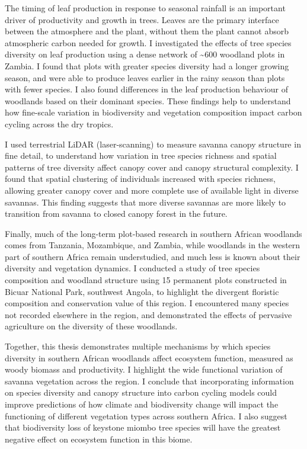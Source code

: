 The timing of leaf production in response to seasonal rainfall is an important driver of productivity and growth in trees. Leaves are the primary interface between the atmosphere and the plant, without them the plant cannot absorb atmospheric carbon needed for growth. I investigated the effects of tree species diversity on leaf production using a dense network of \textasciitilde{}600 woodland plots in Zambia. I found that plots with greater species diversity had a longer growing season, and were able to produce leaves earlier in the rainy season than plots with fewer species. I also found differences in the leaf production behaviour of woodlands based on their dominant species. These findings help to understand how fine-scale variation in biodiversity and vegetation composition impact carbon cycling across the dry tropics.

I used terrestrial LiDAR (laser-scanning) to measure savanna canopy structure in fine detail, to understand how variation in tree species richness and spatial patterns of tree diversity affect canopy cover and canopy structural complexity. I found that spatial clustering of individuals increased with species richness, allowing greater canopy cover and more complete use of available light in diverse savannas. This finding suggests that more diverse savannas are more likely to transition from savanna to closed canopy forest in the future.

Finally, much of the long-term plot-based research in southern African woodlands comes from Tanzania, Mozambique, and Zambia, while woodlands in the western part of southern Africa remain understudied, and much less is known about their diversity and vegetation dynamics. I conducted a study of tree species composition and woodland structure using 15 permanent plots constructed in Bicuar National Park, southwest Angola, to highlight the divergent floristic composition and conservation value of this region. I encountered many species not recorded elsewhere in the region, and demonstrated the effects of pervasive agriculture on the diversity of these woodlands. 

Together, this thesis demonstrates multiple mechanisms by which species diversity in southern African woodlands affect ecosystem function, measured as woody biomass and productivity. I highlight the wide functional variation of savanna vegetation across the region. I conclude that incorporating information on species diversity and canopy structure into carbon cycling models could improve predictions of how climate and biodiversity change will impact the functioning of different vegetation types across southern Africa. I also suggest that biodiversity loss of keystone miombo tree species will have the greatest negative effect on ecosystem function in this biome.
